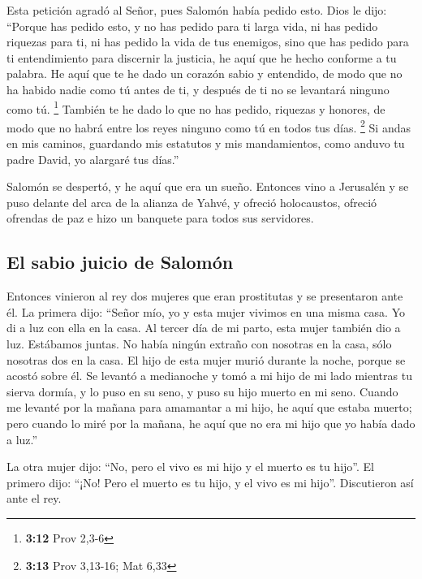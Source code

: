 \begin{paracol}{2}
 Esta petición agradó al Señor, pues Salomón había pedido
esto.  Dios le dijo: ``Porque has pedido esto, y no has
pedido para ti larga vida, ni has pedido riquezas para ti, ni has pedido
la vida de tus enemigos, sino que has pedido para ti entendimiento para
discernir la justicia,  he aquí que he hecho conforme a
tu palabra. He aquí que te he dado un corazón sabio y entendido, de modo
que no ha habido nadie como tú antes de ti, y después de ti no se
levantará ninguno como tú. \footnote{\textbf{3:12} Prov 2,3-6}
 También te he dado lo que no has pedido, riquezas y
honores, de modo que no habrá entre los reyes ninguno como tú en todos
tus días. \footnote{\textbf{3:13} Prov 3,13-16; Mat 6,33}
 Si andas en mis caminos, guardando mis estatutos y mis
mandamientos, como anduvo tu padre David, yo alargaré tus días.''

 Salomón se despertó, y he aquí que era un sueño.
Entonces vino a Jerusalén y se puso delante del arca de la alianza de
Yahvé, y ofreció holocaustos, ofreció ofrendas de paz e hizo un banquete
para todos sus servidores.

\hypertarget{el-sabio-juicio-de-salomuxf3n}{%
\subsection{El sabio juicio de
Salomón}\label{el-sabio-juicio-de-salomuxf3n}}

 Entonces vinieron al rey dos mujeres que eran
prostitutas y se presentaron ante él.  La primera dijo:
``Señor mío, yo y esta mujer vivimos en una misma casa. Yo di a luz con
ella en la casa.  Al tercer día de mi parto, esta mujer
también dio a luz. Estábamos juntas. No había ningún extraño con
nosotras en la casa, sólo nosotras dos en la casa.  El
hijo de esta mujer murió durante la noche, porque se acostó sobre él.
 Se levantó a medianoche y tomó a mi hijo de mi lado
mientras tu sierva dormía, y lo puso en su seno, y puso su hijo muerto
en mi seno.  Cuando me levanté por la mañana para
amamantar a mi hijo, he aquí que estaba muerto; pero cuando lo miré por
la mañana, he aquí que no era mi hijo que yo había dado a luz.''

 La otra mujer dijo: ``No, pero el vivo es mi hijo y el
muerto es tu hijo''. El primero dijo: ``¡No! Pero el muerto es tu hijo,
y el vivo es mi hijo''. Discutieron así ante el rey.


\end{paracol}

